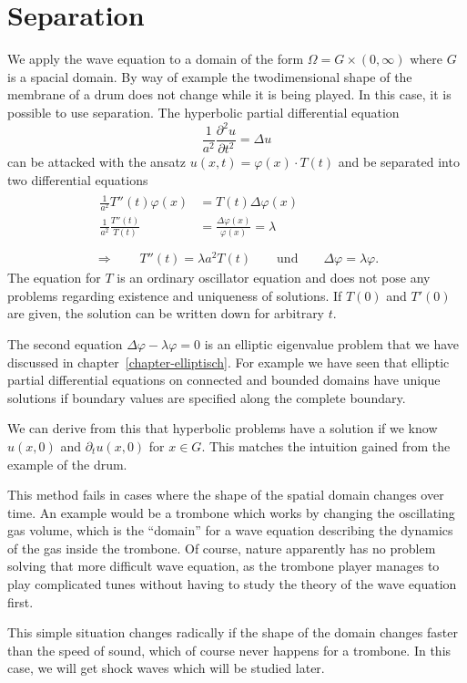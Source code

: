 %
%
%
\section{Separation}
We apply the wave equation to a domain of the form
$\Omega = G\times(0,\infty)$ where $G$ is a spacial domain.
By way of example the twodimensional shape of the membrane of a drum
does not change while it is being played.
In this case, it is possible to use separation.
The hyperbolic partial differential equation
\[
\frac1{a^2}\frac{\partial^2 u}{\partial t^2}=\Delta u
\]
can be attacked with the ansatz $u(x,t)=\varphi(x)\cdot T(t)$ and be 
separated into two differential equations
\begin{gather*}
\begin{aligned}
\frac1{a^2}T''(t)\varphi(x)&=T(t)\Delta \varphi(x)\\
\frac1{a^2}\frac{T''(t)}{T(t)}&=\frac{\Delta\varphi(x)}{\varphi(x)}=\lambda\\
\end{aligned}
\\
\Rightarrow\qquad
T''(t)=\lambda a^2T(t)\qquad\text{und}\qquad\Delta \varphi=\lambda\varphi.
\end{gather*}
The equation for $T$ is an ordinary oscillator equation and does
not pose any problems regarding existence and uniqueness of solutions.
If $T(0)$ and $T'(0)$ are given, the solution can be written down
for arbitrary $t$.

The second equation $\Delta \varphi-\lambda\varphi=0$ is an elliptic
eigenvalue problem that we have discussed in chapter~\ref{chapter-elliptisch}.
For example we have seen that elliptic partial differential equations
on connected and bounded domains have unique solutions if boundary
values are specified along the complete boundary.

We can derive from this that hyperbolic problems have a solution if
we know $u(x,0)$ and $\partial_tu(x,0)$ for $x\in G$.
This matches the intuition gained from the example of the drum.

This method fails in cases where the shape of the spatial domain
changes over time.
An example would be a trombone which works by changing the oscillating
gas volume, which is the ``domain'' for a wave equation describing
the dynamics of the gas inside the trombone. 
Of course, nature apparently has no problem solving that more 
difficult wave equation, as the trombone player manages to play
complicated tunes without having to study the theory of the
wave equation first.

This simple situation changes radically if the shape of the domain
changes faster than the speed of sound, which of course never happens
for a trombone.
In this case, we will get shock waves which will be studied later.

